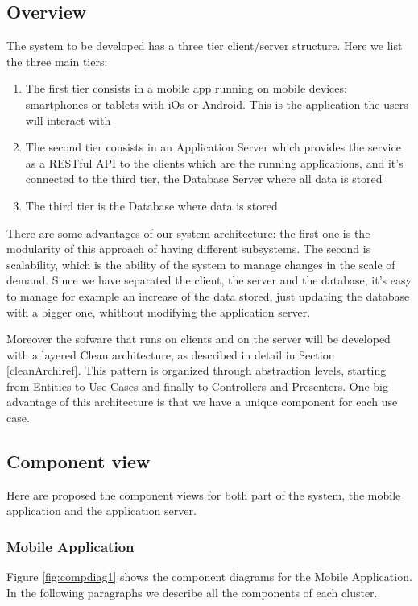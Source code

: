 \subsection{Overview}
The system to be developed has a three tier client/server structure.
Here we list the three main tiers:
\begin{enumerate}
  \item The first tier consists in a mobile app running on mobile devices: smartphones or tablets with iOs or Android. This is the application the users will interact with
  \item The second tier consists in an Application Server which provides the service as a RESTful API to the clients which are the running applications, and it's connected to the third tier, the Database Server where all data is stored
  \item The third tier is the Database where data is stored
\end{enumerate}

There are some advantages of our system architecture: the first one is the modularity of this approach of having different subsystems. The second is scalability,  which is the ability of the system to manage changes in the scale of demand. Since we have separated the client, the server and the database, it's easy to manage for example an increase of the data stored, just updating the database with a bigger one, whithout modifying the application server.

Moreover the sofware that runs on clients and on the server will be developed with a layered Clean architecture, as described in detail in Section \ref{cleanArchiref}. This pattern is organized through abstraction levels, starting from Entities to Use Cases and finally to Controllers and Presenters.
One big advantage of this architecture is that we have a unique component for each use case.

\subsection{Component view}
Here are proposed the component views for both part of the system, the mobile application and the application server.

\subsubsection{Mobile Application}
Figure \ref{fig:compdiag1} shows the component diagrams for the Mobile Application. In the following paragraphs we describe all the components of each cluster.

